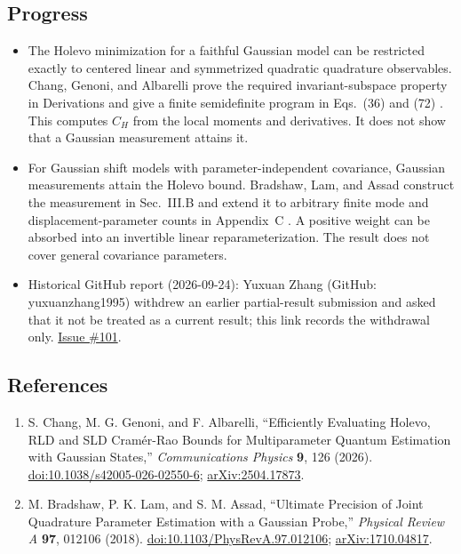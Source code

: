 \subsection*{Progress}

\begin{itemize}
  \item The Holevo minimization for a faithful Gaussian model can be restricted exactly to centered linear and symmetrized quadratic quadrature observables. Chang, Genoni, and Albarelli prove the required invariant-subspace property in Derivations and give a finite semidefinite program in Eqs.~(36) and (72) . This computes $C_H$ from the local moments and derivatives. It does not show that a Gaussian measurement attains it.

  \item For Gaussian shift models with parameter-independent covariance, Gaussian measurements attain the Holevo bound. Bradshaw, Lam, and Assad construct the measurement in Sec.~III.B and extend it to arbitrary finite mode and displacement-parameter counts in Appendix~C . A positive weight can be absorbed into an invertible linear reparameterization. The result does not cover general covariance parameters.

  \item Historical GitHub report (2026-09-24): Yuxuan Zhang (GitHub: yuxuanzhang1995) withdrew an earlier partial-result submission and asked that it not be treated as a current result; this link records the withdrawal only. \href{https://github.com/Naixu-Guo/quantum-open-problems/issues/101}{Issue \#101}.
\end{itemize}

\subsection*{References}

\begin{enumerate}[label={},leftmargin=4.8em,labelsep=0.5em]
  \footnotesize
  \item[\textup{[CGA26]}]\label{ref:sr32-chang}
  S. Chang, M. G. Genoni, and F. Albarelli, ``Efficiently Evaluating Holevo, RLD and SLD Cram\'er-Rao Bounds for Multiparameter Quantum Estimation with Gaussian States,'' \emph{Communications Physics} \textbf{9}, 126 (2026). \href{https://doi.org/10.1038/s42005-026-02550-6}{doi:10.1038/s42005-026-02550-6}; \href{https://arxiv.org/abs/2504.17873}{arXiv:2504.17873}.

  \item[\textup{[BLA18]}]\label{ref:sr32-bradshaw}
  M. Bradshaw, P. K. Lam, and S. M. Assad, ``Ultimate Precision of Joint Quadrature Parameter Estimation with a Gaussian Probe,'' \emph{Physical Review A} \textbf{97}, 012106 (2018). \href{https://doi.org/10.1103/PhysRevA.97.012106}{doi:10.1103/PhysRevA.97.012106}; \href{https://arxiv.org/abs/1710.04817}{arXiv:1710.04817}.
\end{enumerate}

